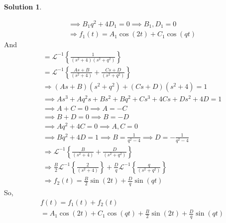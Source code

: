 \documentclass[10pt]{article}
\theoremstyle{definition}
\newtheorem{soln}{Solution}
\newcommand{\laplacei}[1]{\mathcal{L}^{-1}\left\{#1\right\}}
\begin{document}
\begin{soln}
\begin{enumerate}[label=(\alph*)]
\begin{align*}
             & \implies B_1q^2+4D_1=0\implies B_1,D_1=0                                                           \\
             & \Rightarrow f_1(t)=A_1\cos\left(2t\right)+C_1\cos\left(qt\right)
          \end{align*}
          And
          \begin{align*}
             & = \laplacei{\frac{1}{\left(s^2+4\right)\left(s^2+q^2\right)}}                                                       \\
             & = \laplacei{\frac{As+B}{\left(s^2+4\right)}+\frac{Cs+D}{\left(s^2+q^2\right)}}                                      \\
             & \Rightarrow \left(As+B\right)\left(s^2+q^2\right) + \left(Cs+D\right)\left(s^2+4\right)=1                           \\
             & \implies As^3+Aq^2s+Bs^2+Bq^2+Cs^3+4Cs+Ds^2+4D=1                                                                    \\
             & \implies A+C=0 \implies A=-C                                                                                        \\
             & \implies B+D=0 \implies B=-D                                                                                        \\
             & \implies Aq^2+4C=0\implies A,C=0                                                                                    \\
             & \implies Bq^2+4D=1\implies B=\frac{1}{q^2-4}\implies D=-\frac{1}{q^2-4}                                             \\
             & \Rightarrow \laplacei{\frac{B}{\left(s^2+4\right)}+\frac{D}{\left(s^2+q^2\right)}}                                  \\
             & \Rightarrow \frac{B}{2}\laplacei{\frac{2}{\left(s^2+4\right)}}+\frac{D}{q}\laplacei{\frac{q}{\left(s^2+q^2\right)}} \\
             & \Rightarrow f_2(t)=\frac{B}{2}\sin\left(2t\right)+\frac{D}{q}\sin\left(qt\right)
          \end{align*}
          So,
          \begin{align*}
             & f(t)=f_1(t)+f_2(t)                                                                                                                                                \\
             & =A_1\cos\left(2t\right)+C_1\cos\left(qt\right)+\frac{B}{2}\sin\left(2t\right)+\frac{D}{q}\sin\left(qt\right)                                                      \\

\end{align*}
\end{enumerate}
\end{soln}
\end{document}

